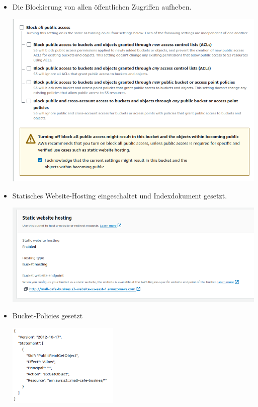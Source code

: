 \documentclass{article}
\begin{document}
\begin{itemize}
	\item Die Blockierung von allen öffentlichen Zugriffen aufheben.
	
	
	\includegraphics[width=\textwidth]{images/accesslist.png}
	
	\item Statisches Website-Hosting eingeschaltet und Indexdokument gesetzt.
	
	
	\includegraphics[width=\textwidth]{images/staticwebsitehosting.png}
	\pagebreak
	\item Bucket-Policies gesetzt
	
	
	\includegraphics[width=200px]{images/jsonpermission.png}

\end{itemize}


\bigskip
\end{document}
